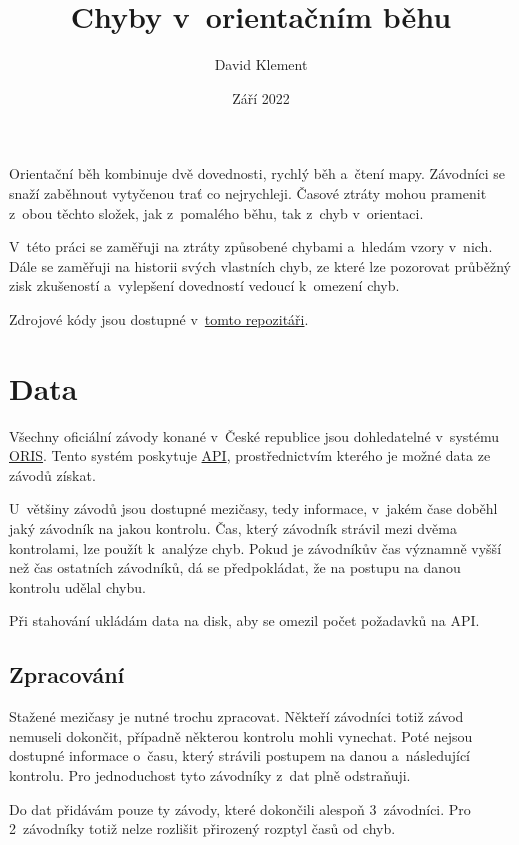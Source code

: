 \documentclass[a4paper,11pt]{article}
\title{\Huge Chyby v~orientačním běhu}
\author{David Klement}
\date{Září 2022}
\begin{document}
\maketitle
\thispagestyle{empty}
\pagebreak

Orientační běh kombinuje dvě dovednosti, rychlý běh a~čtení mapy. Závodníci se
snaží zaběhnout vytyčenou trať co nejrychleji. Časové ztráty mohou pramenit
z~obou těchto složek, jak z~pomalého běhu, tak z~chyb v~orientaci.

V~této práci se zaměřuji na ztráty způsobené chybami a~hledám vzory v~nich. Dále
se zaměřuji na historii svých vlastních chyb, ze které lze pozorovat průběžný
zisk zkušeností a~vylepšení dovedností vedoucí k~omezení chyb.

Zdrojové kódy jsou dostupné
v~\href{https://github.com/kulisak12/mistake-stats}{tomto repozitáři}.

\section*{Data}

Všechny oficiální závody konané v~České republice jsou dohledatelné v~systému
\href{https://oris.orientacnisporty.cz/?sport=1}{ORIS}. Tento systém poskytuje
\href{https://oris.orientacnisporty.cz/API}{API}, prostřednictvím kterého je možné
data ze závodů získat.

U~většiny závodů jsou dostupné mezičasy, tedy informace, v~jakém čase doběhl
jaký závodník na jakou kontrolu. Čas, který závodník strávil mezi dvěma
kontrolami, lze použít k~analýze chyb. Pokud je závodníkův čas významně vyšší
než čas ostatních závodníků, dá se předpokládat, že na postupu na danou kontrolu
udělal chybu.

Při stahování ukládám data na disk, aby se omezil počet požadavků na API.

\subsection*{Zpracování}

Stažené mezičasy je nutné trochu zpracovat. Někteří závodníci totiž závod
nemuseli dokončit, případně některou kontrolu mohli vynechat. Poté nejsou
dostupné informace o~času, který strávili postupem na danou a~následující
kontrolu. Pro jednoduchost tyto závodníky z~dat plně odstraňuji.

Do dat přidávám pouze ty závody, které dokončili alespoň 3~závodníci. Pro
2~závodníky totiž nelze rozlišit přirozený rozptyl časů od chyb.
\end{document}
